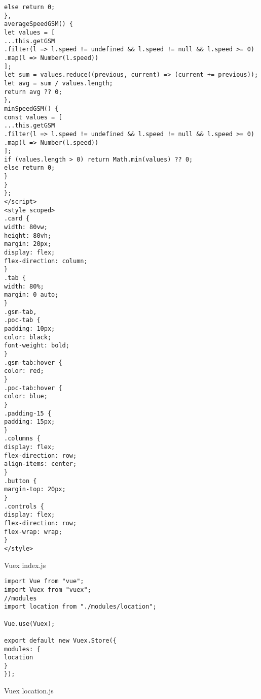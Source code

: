 \begin{lstlisting}
else return 0;
},
averageSpeedGSM() {
let values = [
...this.getGSM
.filter(l => l.speed != undefined && l.speed != null && l.speed >= 0)
.map(l => Number(l.speed))
];
let sum = values.reduce((previous, current) => (current += previous));
let avg = sum / values.length;
return avg ?? 0;
},
minSpeedGSM() {
const values = [
...this.getGSM
.filter(l => l.speed != undefined && l.speed != null && l.speed >= 0)
.map(l => Number(l.speed))
];
if (values.length > 0) return Math.min(values) ?? 0;
else return 0;
}
}
};
</script>
<style scoped>
.card {
width: 80vw;
height: 80vh;
margin: 20px;
display: flex;
flex-direction: column;
}
.tab {
width: 80%;
margin: 0 auto;
}
.gsm-tab,
.poc-tab {
padding: 10px;
color: black;
font-weight: bold;
}
.gsm-tab:hover {
color: red;
}
.poc-tab:hover {
color: blue;
}
.padding-15 {
padding: 15px;
}
.columns {
display: flex;
flex-direction: row;
align-items: center;
}
.button {
margin-top: 20px;
}
.controls {
display: flex;
flex-direction: row;
flex-wrap: wrap;
}
</style>
\end{lstlisting}
Vuex index.js
\begin{lstlisting}
import Vue from "vue";
import Vuex from "vuex";
//modules
import location from "./modules/location";

Vue.use(Vuex);

export default new Vuex.Store({
modules: {
location
}
});
\end{lstlisting}
Vuex location.js
